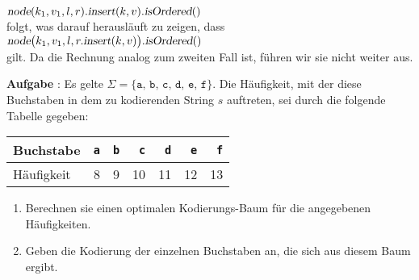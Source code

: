 \documentclass{article}
\newcounter{aufgabe}
\newcommand{\exercise}{\vspace*{0.2cm}
\stepcounter{aufgabe}

\noindent
\textbf{Aufgabe \arabic{aufgabe}}: }
\begin{document}
\begin{enumerate}
\begin{enumerate}
            \\[0.2cm]
            \hspace*{1.3cm}
            $\textsl{node}(k_1,v_1,l,r).\textsl{insert}(k,v).\textsl{isOrdered}()$
            \\[0.2cm]
            folgt, was darauf herausl\"auft zu zeigen, dass
            \\[0.2cm]
            \hspace*{1.3cm}
            $\textsl{node}\bigl(k_1,v_1,l,r.\textsl{insert}(k,v)\bigr).\textsl{isOrdered}()$
            \\[0.2cm]
            gilt.  Da die Rechnung analog zum zweiten Fall ist, f\"uhren wir sie nicht weiter aus.
      \end{enumerate}
\end{enumerate}
\pagebreak

\exercise
Es gelte $\Sigma = \{ \mathtt{a},\,\mathtt{b},\,\mathtt{c},\,\mathtt{d},\,\mathtt{e},\,\mathtt{f} \}$.
Die H\"aufigkeit, mit der diese Buchstaben in dem zu kodierenden String $s$ auftreten, sei durch die
folgende Tabelle gegeben:

\begin{center}
\begin{tabular}[t]{|l|r|r|r|r|r|r|}
\hline
Buchstabe  & \texttt{a} & \texttt{b} & \texttt{c} & \texttt{d} & \texttt{e} & \texttt{f} \\
\hline
H\"aufigkeit &          8 &          9 &         10 &         11 &         12 &         13 \\
\hline
\end{tabular}
\end{center}
\begin{enumerate}
\item Berechnen sie einen optimalen Kodierungs-Baum f\"ur die angegebenen H\"aufigkeiten.
\item Geben die Kodierung der einzelnen Buchstaben an, die sich aus diesem Baum ergibt.
\end{enumerate}
\end{document}
